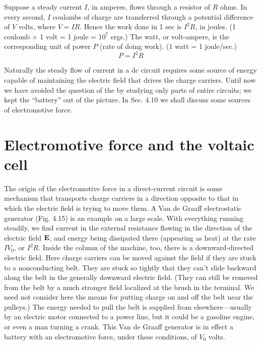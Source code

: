 Suppose a steady current $I$, in amperes, flows through a resistor
of $R$ ohms. In every second, $I$ coulombs of charge are transferred
through a potential difference of $V$ volts, where $V = IR$. Hence the
work done in 1 sec is $I^2R$, in joules. (1 coulomb $\times$ 1 volt = 1 joule =
$10^7$ ergs.) The watt, or volt-ampere, is the corresponding unit of
power $P$ (rate of doing work). (1 watt = 1 joule/sec.)
\begin{equation}
  P = I^2 R
\end{equation}

Naturally the steady flow of current in a dc circuit requires some
source of energy capable of maintaining the electric field that drives
the charge carriers. Until now we have avoided the question of the
 by studying only parts of entire circuits; we kept
the ``battery'' out of the picture. In Sec. 4.10 we shall discuss some
sources of electromotive force.

\section{Electromotive force and the voltaic cell}

The origin of the electromotive force in a direct-current circuit is
some mechanism that transports charge carriers in a direction opposite
to that in which the electric field is trying to move them.
A Van de Graaff electrostatic generator (Fig. 4.15) is an example on
a large scale. With everything running steadily, we find current in
the external resistance flowing in the direction of the electric field $\mathbf{E}$,
and energy being dissipated there (appearing as heat) at the rate
$I V_0$, or $I^2R$. Inside the column of the machine, too, there is a 
downward-directed electric field. Here charge carriers can be moved
against the field if they are stuck to a nonconducting belt. They are
stuck so tightly that they can't slide backward along the belt in the
generally downward electric field. (They can still be removed from
the belt by a much stronger field localized at the brush in the 
terminal. We need not consider here the means for putting charge on and
off the belt near the pulleys.) The energy needed to pull the belt is
supplied from elsewhere---usually by an electric motor connected to
a power line, but it could be a gasoline engine, or even a man turning
a crank. This Van de Graaff generator is in effect a battery with an
electromotive force, under these conditions, of $V_0$ volts.

